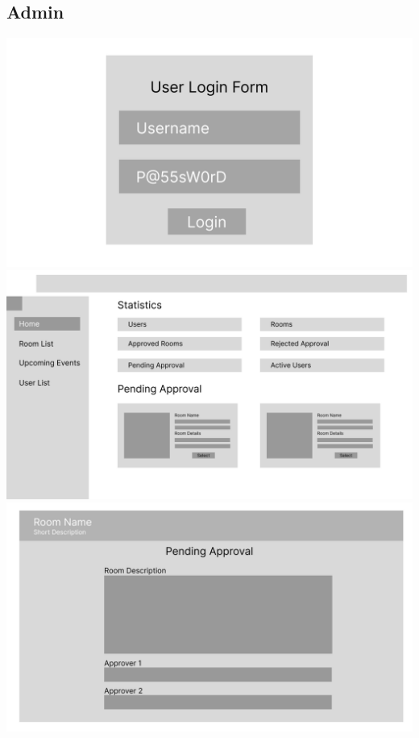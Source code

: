 \documentclass[12pt,titlepage,a4paper]{report}
\begin{document}
    \subsection{Admin}
    \begin{center}
        \includegraphics[width=\textwidth]{images/figures/UIUX/Login_Page_(Atmin).png}\\
        \includegraphics[width=\textwidth]{images/figures/UIUX/Homies_Page_(Atmin).png}\\
        \includegraphics[width=\textwidth]{images/figures/UIUX/Pending_Approval_(Atmin).png}\\

\end{center}
\end{document}

